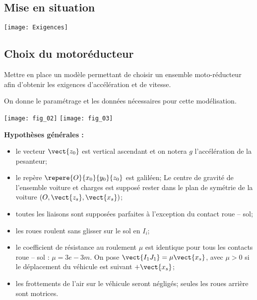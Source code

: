 \ifprof
\else
\begin{multicols}{2}
\fi

\section*{Mise en situation}
\ifprof
\else


\begin{center}
\texttt{[image: Exigences]}
\end{center}

\fi

\subsection*{Choix du motoréducteur}


\begin{obj}
Mettre en place un modèle permettant de choisir un ensemble moto-réducteur afin d’obtenir les
exigences d’accélération et de vitesse.
\end{obj}

\ifprof

\else

On donne le paramétrage et les données nécessaires pour cette modélisation.

\begin{center}
\texttt{[image: fig\_02]}
\texttt{[image: fig\_03]}
\end{center}


\textbf{Hypothèses générales : }
\begin{itemize}
\item le vecteur $\vect{z_0}$ est vertical ascendant et on notera $g$ l'accélération de la pesanteur;
\item le repère $\repere{O}{x_0}{y_0}{z_0}$ est galiléen;
Le centre de gravité de l’ensemble voiture et charges est supposé rester dans le
plan de symétrie de la voiture $\left(O,\vect{z_s},\vect{x_s}\right)$;
\item toutes les liaisons sont supposées parfaites à l’exception du contact roue -- sol;
\item les roues roulent sans glisser sur le sol en $I_i$;
\item le coefficient de résistance au roulement $\mu$ est identique pour tous les contacts
roue -- sol : $\mu = \si{3e-3}{m}$. On pose $\vect{I_1J_1}=\mu \vect{x_s}$, avec $\mu >0$
si le déplacement du véhicule est suivant $+\vect{x_s}$;
\item les frottements de l’air sur le véhicule seront négligés;
seules les roues arrière sont motrices.
\end{itemize}


\end{multicols}
